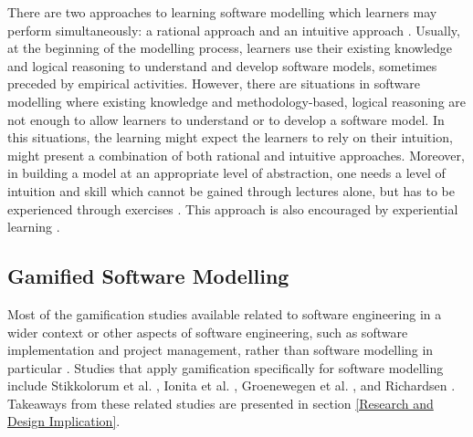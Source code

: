 \documentclass[12pt, a4paper]{report}
\begin{document}
{There are two approaches to learning software modelling which learners may perform simultaneously: a rational approach and an intuitive approach \cite{bobkowska2014software}. Usually, at the beginning of the modelling process, learners use their existing knowledge and logical reasoning to understand and develop software models, sometimes preceded by empirical activities. However, there are situations in software modelling where existing knowledge and methodology-based, logical reasoning are not enough to allow learners to understand or to develop a software model. In this situations, the learning might expect the learners to rely on their intuition, might present a combination of both rational and intuitive approaches. Moreover, in building a model at an appropriate level of abstraction, one needs a level of intuition and skill which cannot be gained through lectures alone, but has to be experienced through exercises \cite{engels2005teaching}. This approach is also encouraged by experiential learning \cite{kolb2014experiential}.   

\subsection{Gamified Software Modelling}
\label{Gamified Software Modelling}
Most of the gamification studies available related to software engineering in a wider context or other aspects of software engineering, such as software implementation and project management, rather than software modelling in particular \cite{Pedreira2015}. Studies that apply gamification specifically for software modelling include Stikkolorum et al. \cite{Stikkolorum2014}, Ionita et al. \cite{Ionita2015}, Groenewegen et al. \cite{Groenewegen2010}, and Richardsen \cite{Richardsen2014}. Takeaways from these related studies are presented in section \ref{Research and Design Implication}.

}
\end{document}
